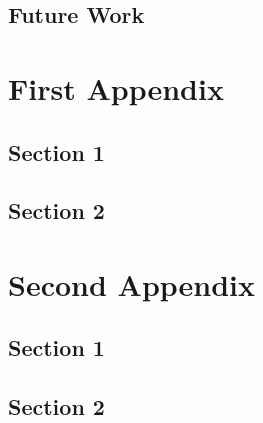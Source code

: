   \section{Future Work}\label{sec:}
    \lipsum[38]\cite{TEST}
        \printreferences 


\bigskip 
\clearpage\singlespacing

\printbibliography[heading=bibintoc]
\bigskip

\appendix
\chapter{First Appendix}\label{app:}
  \section{Section 1}\label{sec:}
    \lipsum[34-36]
  \section{Section 2}\label{sec:}
    \lipsum[38]

\chapter{Second Appendix}\label{app:}
  \section{Section 1}\label{sec:}
    \lipsum[34-36]
  \section{Section 2}\label{sec:}
    \lipsum[38]




